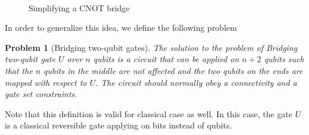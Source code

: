 \documentclass{report}
\newtheorem{problem}{Problem}
\begin{document}
\begin{figure}[ht]
  \centering
   \\

  \caption{Simplifying a CNOT bridge}
  \label{ex:cnot-bridge-decomposition}
\end{figure}

In order to generalize this idea, we define the following problem

\begin{problem}[Bridging two-qubit gates]
  The solution to the problem of Bridging two-qubit gate $U$ over $n$ qubits is a circuit that can be applied on $n + 2$ qubits such that the $n$ qubits in the middle are not affected and the two qubits on the ends are mapped with respect to $U$. The circuit should normally obey a connectivity and a gate set constraints.
\end{problem}

Note that this definition is valid for classical case as well. In this case, the gate $U$ is a classical reversible gate applying on bits instead of qubits.
\end{document}
